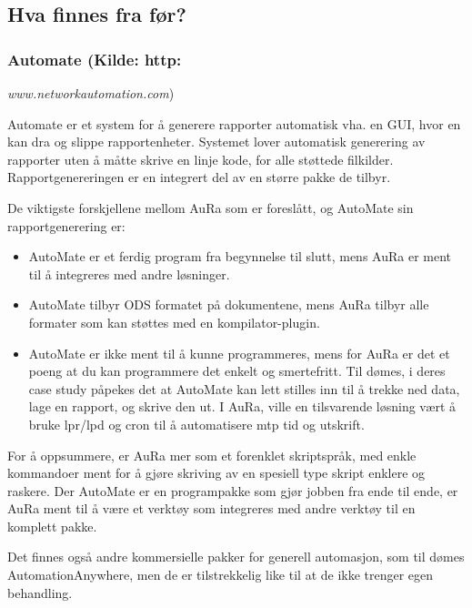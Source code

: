 \documentclass[11pt]{article}
\begin{document}
\begin{itemize}
\subsection{Hva finnes fra før?}



\subsubsection{Automate (Kilde: http:}\textit{www.networkautomation.com})
\end{itemize}

Automate er et system for å generere rapporter automatisk vha. en GUI, hvor en kan dra og slippe rapportenheter. Systemet lover automatisk generering av rapporter uten å måtte skrive en linje kode, for alle støttede filkilder. Rapportgenereringen er en integrert del av en større pakke de tilbyr.



De viktigste forskjellene mellom AuRa som er foreslått, og AutoMate sin rapportgenerering er:




\begin{itemize}
\item AutoMate er et ferdig program fra begynnelse til slutt, mens AuRa er ment til å integreres med andre løsninger.
\item AutoMate tilbyr ODS formatet på dokumentene, mens AuRa tilbyr alle formater som kan støttes med en kompilator-plugin.
\item AutoMate er ikke ment til å kunne programmeres, mens for AuRa er det et poeng at du kan programmere det enkelt og smertefritt. Til dømes, i deres case study påpekes det at AutoMate kan lett stilles inn til å trekke ned data, lage en rapport, og skrive den ut. I AuRa, ville en tilsvarende løsning vært å bruke lpr/lpd og cron til å automatisere mtp tid og utskrift.
\end{itemize}

For å oppsummere, er AuRa mer som et forenklet skriptspråk, med enkle kommandoer ment for å gjøre skriving av en spesiell type skript enklere og raskere. Der AutoMate er en programpakke som gjør jobben fra ende til ende, er AuRa ment til å være et verktøy som integreres med andre verktøy til en komplett pakke.



Det finnes også andre kommersielle pakker for generell automasjon, som til dømes AutomationAnywhere, men de er tilstrekkelig like til at de ikke trenger egen behandling.
\end{document}

